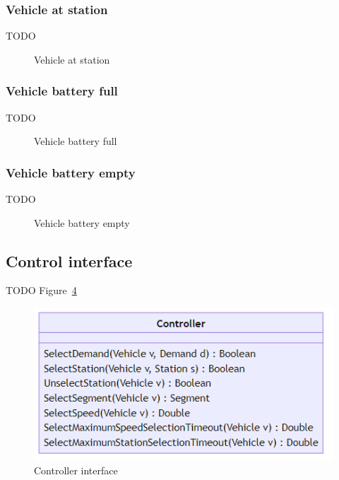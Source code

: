 \documentclass{IEEEtran}
\begin{document}
    \subsubsection{Vehicle at station}
    TODO

    \begin{figure}[htbp]
        \centering
        \caption{Vehicle at station}
        \label{fig:vehicle-at-station}
    \end{figure}

    \subsubsection{Vehicle battery full}
    TODO

    \begin{figure}[htbp]
        \centering
        \caption{Vehicle battery full}
        \label{fig:vehicle-battery-full}
    \end{figure}

    \subsubsection{Vehicle battery empty}
    TODO

    \begin{figure}[htbp]
        \centering
        \caption{Vehicle battery empty}
        \label{fig:vehicle-battery-empty}
    \end{figure}

    \subsection{Control interface}
    \label{sec:controller}
    TODO Figure~\ref{fig:controller}

    \begin{figure}[t]
        \centering
        \includegraphics[scale=0.5]{../../diagrams/controller/classes-minimal.png}
        \caption{Controller interface}
        \label{fig:controller}
    \end{figure}
\end{document}

